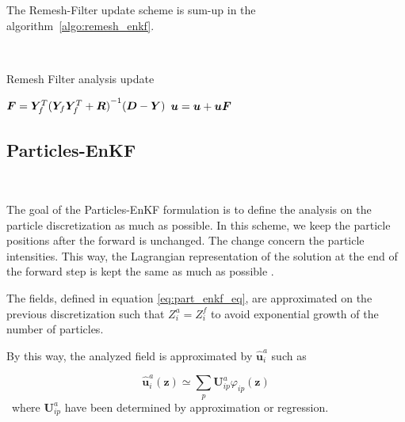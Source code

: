The Remesh-Filter update scheme is sum-up in the algorithm~\ref{algo:remesh_enkf}.

\begin{algorithm}~\label{algo:remesh_enkf}

    \caption{Remesh Filter analysis update}

    $ \bm{F} = \bm Y_f^T {(\bm Y_f \bm Y_f^T + \bm R)}^{-1}(\bm{D} - \bm{Y})$ 
    $\bm u = \bm u + \bm u \bm{F}$ 
\end{algorithm}

\subsection{Particles-EnKF}~\label{part_enkf}

The goal of the Particles-EnKF formulation is to define the analysis on the particle discretization as much as possible. In this scheme, we keep the particle positions after the forward is unchanged. The change concern the particle intensities. This way, the Lagrangian representation of the solution at the end of the forward step is kept the same as much as possible .

The fields, defined in equation \eqref{eq:part_enkf_eq}, are approximated on the previous discretization such that $Z^a_i = Z_i^f$ to avoid exponential growth of the number of particles.


By this way, the analyzed field is approximated by $\hat{\bm u}^a_i$ such as

\begin{equation*}
    \hat{\bm u}^a_i(\bm z) \simeq \sum_p \bm U^a_{ip} \varphi_{ip}(\bm z)
\end{equation*}~where $\bm U^a_{ip}$ have been determined by approximation or regression.


